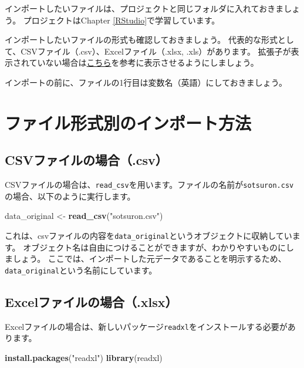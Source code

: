 \documentclass[]{book}
\newenvironment{Shaded}{\begin{snugshade}}{\end{snugshade}}
\newcommand{\KeywordTok}[1]{\textcolor[rgb]{0.13,0.29,0.53}{\textbf{#1}}}
\newcommand{\StringTok}[1]{\textcolor[rgb]{0.31,0.60,0.02}{#1}}
\newcommand{\NormalTok}[1]{#1}
\begin{document}
インポートしたいファイルは、プロジェクトと同じフォルダに入れておきましょう。
プロジェクトはChapter \ref{RStudio}で学習しています。

インポートしたいファイルの形式も確認しておきましょう。
代表的な形式として、CSVファイル（.csv）、Excelファイル（.xlsx,
.xls）があります。
拡張子が表示されていない場合は\href{https://pc-karuma.net/windows-10-show-explorer-file-name-extension/}{こちら}を参考に表示させるようにしましょう。

インポートの前に、ファイルの1行目は変数名（英語）にしておきましょう。

\section{ファイル形式別のインポート方法}\label{ux30d5ux30a1ux30a4ux30ebux5f62ux5f0fux5225ux306eux30a4ux30f3ux30ddux30fcux30c8ux65b9ux6cd5}

\subsection{CSVファイルの場合（.csv）}\label{csvux30d5ux30a1ux30a4ux30ebux306eux5834ux5408.csv}

CSVファイルの場合は、\texttt{read\_csv}を用います。ファイルの名前が\texttt{sotsuron.csv}の場合、以下のように実行します。

\begin{Shaded}
\begin{Highlighting}[]
\NormalTok{data_original <-}\StringTok{ }\KeywordTok{read_csv}\NormalTok{(}\StringTok{"sotsuron.csv"}\NormalTok{)}
\end{Highlighting}
\end{Shaded}

これは、csvファイルの内容を\texttt{data\_original}というオブジェクトに収納しています。
オブジェクト名は自由につけることができますが、わかりやすいものにしましょう。
ここでは、インポートした元データであることを明示するため、\texttt{data\_original}という名前にしています。

\subsection{Excelファイルの場合（.xlsx）}\label{excelux30d5ux30a1ux30a4ux30ebux306eux5834ux5408.xlsx}

Excelファイルの場合は、新しいパッケージ\texttt{readxl}をインストールする必要があります。

\begin{Shaded}
\begin{Highlighting}[]
\KeywordTok{install.packages}\NormalTok{(}\StringTok{"readxl"}\NormalTok{)}
\KeywordTok{library}\NormalTok{(readxl)}
\end{Highlighting}
\end{Shaded}
\end{document}
